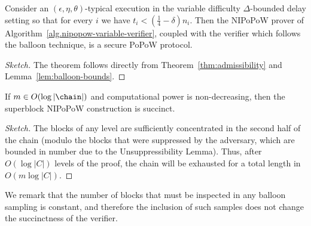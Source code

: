 \begin{theorem}[Security]
   Consider an $(\epsilon, \eta, \theta)$-typical execution in the variable
   difficulty $\Delta$-bounded delay setting so that for every $i$
   we have $t_i < (\frac{1}{4} - \delta)n_i$.
   Then the NIPoPoW prover of Algorithm~\ref{alg.nipopow-variable-verifier},
   coupled with the verifier which follows the balloon technique, is
   a secure PoPoW protocol.
\end{theorem}
\begin{proof}[Sketch]
  The theorem follows directly from Theorem~\ref{thm:admissibility} and
  Lemma~\ref{lem:balloon-bounds}.
\end{proof}
%

\begin{theorem}[Succinctness]
  If $m \in O(\log|\chain|)$ and computational power is non-decreasing, then
  the superblock NIPoPoW construction is succinct.
\end{theorem}
\begin{proof}[Sketch]
The blocks of any level are
sufficiently concentrated in the second half of the chain (modulo the blocks
that were suppressed by the adversary, which are bounded in number due to the
Unsuppressibility Lemma). Thus, after $O(\log|C|)$ levels of the proof, the
chain will be exhausted for a total length in $O(m\log|C|)$.
\end{proof}

We remark that the number of blocks that must be inspected in any balloon
sampling is constant, and therefore the inclusion of such samples does not
change the succinctness of the verifier.
